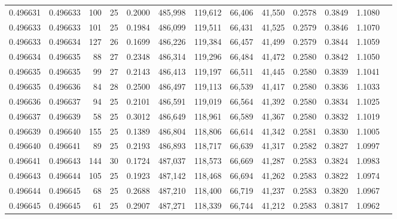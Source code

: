 \begin{tabular}{rrrrrrrrrrrrr}
0.496631 & 0.496633 & 100 &  25 &                                     0.2000 & 485,998 & 119,612 &  66,406 &  41,550 & 0.2578 & 0.3849 & 1.1080 \\
0.496633 & 0.496633 & 101 &  25 &                                     0.1984 & 486,099 & 119,511 &  66,431 &  41,525 & 0.2579 & 0.3846 & 1.1070 \\
0.496633 & 0.496634 & 127 &  26 &                                     0.1699 & 486,226 & 119,384 &  66,457 &  41,499 & 0.2579 & 0.3844 & 1.1059 \\
0.496634 & 0.496635 &  88 &  27 &                                     0.2348 & 486,314 & 119,296 &  66,484 &  41,472 & 0.2580 & 0.3842 & 1.1050 \\
0.496635 & 0.496635 &  99 &  27 &                                     0.2143 & 486,413 & 119,197 &  66,511 &  41,445 & 0.2580 & 0.3839 & 1.1041 \\
0.496635 & 0.496636 &  84 &  28 &                                     0.2500 & 486,497 & 119,113 &  66,539 &  41,417 & 0.2580 & 0.3836 & 1.1033 \\
0.496636 & 0.496637 &  94 &  25 &                                     0.2101 & 486,591 & 119,019 &  66,564 &  41,392 & 0.2580 & 0.3834 & 1.1025 \\
0.496637 & 0.496639 &  58 &  25 &                                     0.3012 & 486,649 & 118,961 &  66,589 &  41,367 & 0.2580 & 0.3832 & 1.1019 \\
0.496639 & 0.496640 & 155 &  25 &                                     0.1389 & 486,804 & 118,806 &  66,614 &  41,342 & 0.2581 & 0.3830 & 1.1005 \\
0.496640 & 0.496641 &  89 &  25 &                                     0.2193 & 486,893 & 118,717 &  66,639 &  41,317 & 0.2582 & 0.3827 & 1.0997 \\
0.496641 & 0.496643 & 144 &  30 &                                     0.1724 & 487,037 & 118,573 &  66,669 &  41,287 & 0.2583 & 0.3824 & 1.0983 \\
0.496643 & 0.496644 & 105 &  25 &                                     0.1923 & 487,142 & 118,468 &  66,694 &  41,262 & 0.2583 & 0.3822 & 1.0974 \\
0.496644 & 0.496645 &  68 &  25 &                                     0.2688 & 487,210 & 118,400 &  66,719 &  41,237 & 0.2583 & 0.3820 & 1.0967 \\
0.496645 & 0.496645 &  61 &  25 &                                     0.2907 & 487,271 & 118,339 &  66,744 &  41,212 & 0.2583 & 0.3817 & 1.0962 \\

\end{tabular}
